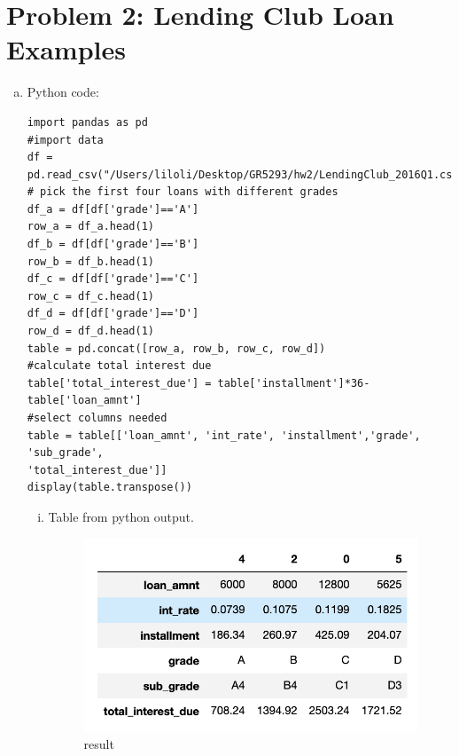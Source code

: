 \documentclass{article}
\begin{document}
\newpage
\section*{Problem 2: Lending Club Loan Examples}

\begin{enumerate}[(a)]
   \item Python code:
\begin{verbatim}
import pandas as pd 
#import data
df = pd.read_csv("/Users/liloli/Desktop/GR5293/hw2/LendingClub_2016Q1.csv") 
# pick the first four loans with different grades
df_a = df[df['grade']=='A']
row_a = df_a.head(1)
df_b = df[df['grade']=='B']
row_b = df_b.head(1)
df_c = df[df['grade']=='C']
row_c = df_c.head(1)
df_d = df[df['grade']=='D']
row_d = df_d.head(1)
table = pd.concat([row_a, row_b, row_c, row_d])
#calculate total interest due
table['total_interest_due'] = table['installment']*36-table['loan_amnt']
#select columns needed
table = table[['loan_amnt', 'int_rate', 'installment','grade',  'sub_grade', 
'total_interest_due']]
display(table.transpose())
\end{verbatim}

   
   \begin{enumerate}[(i)]
       \item Table from python output.
          
    \begin{figure}[h!]
    \centering
    \includegraphics[scale=0.50]{hw2Problem2_a}
    \caption{result}
    \label{fig:original fico_hist}
    \end{figure}
       

 
   

       
   \end{enumerate}
   

\end{enumerate}
\end{document}
